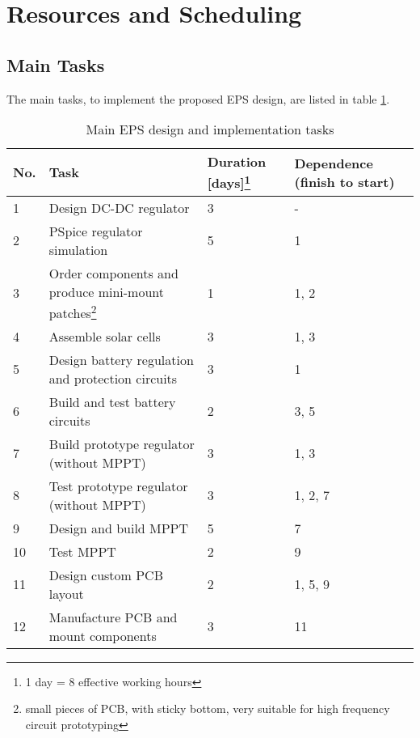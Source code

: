\section{Resources and Scheduling}
\label{sec:resources_scheduling}

\subsection{Main Tasks}

The main tasks, to implement the proposed \ac{EPS} design, are listed in table \ref{tab:main_tasks}.

\begin{table}[H]
\centering
\caption{Main \ac{EPS} design and implementation tasks}
\label{tab:main_tasks}
\begin{minipage}{\textwidth}
\centering
\begin{tabular}{|p{}|p{}|p{}|p{}|}
\hline
\textbf{No.} & \textbf{Task} & \textbf{Duration [days]}\footnote{1 day = 8 effective working hours} & \textbf{Dependence (finish to start)}\\
\hline
1 & Design DC-DC regulator & 3 & - \\
2 & PSpice regulator simulation & 5 & 1 \\
3 & Order components and produce mini-mount patches\footnote{small pieces of PCB, with sticky bottom, very suitable for high frequency circuit prototyping} & 1 & 1, 2\\
4 & Assemble solar cells & 3 & 1, 3\\
5 & Design battery regulation and protection circuits & 3 & 1\\
6 & Build and test battery circuits & 2 & 3, 5\\
7 & Build prototype regulator (without MPPT) & 3 & 1, 3\\
8 & Test prototype regulator (without MPPT) & 3 & 1, 2, 7\\
9 & Design and build MPPT & 5 & 7\\
10 & Test MPPT & 2 & 9\\
11 & Design custom PCB layout & 2 & 1, 5, 9\\
12 & Manufacture PCB and mount components & 3 & 11\\
\hline
\end{tabular}\par
\vspace{-0.75\skip\footins}
\renewcommand{\footnoterule}{}
\end{minipage}
\end{table}

